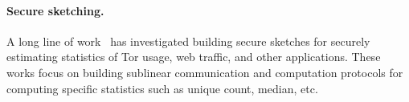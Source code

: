 



\paragraph{Secure sketching.}
A long line of work~\cite{CCS:ElaDanGol14,CCS:JanJoh16,NDSS:MelDanDec16,CCS:WJSYG19,PoPETS:CDKY20} has investigated building secure sketches for securely estimating statistics of Tor usage, web traffic, and other applications.  These works focus on building sublinear communication and computation protocols for computing specific statistics such as unique count, median, etc.
